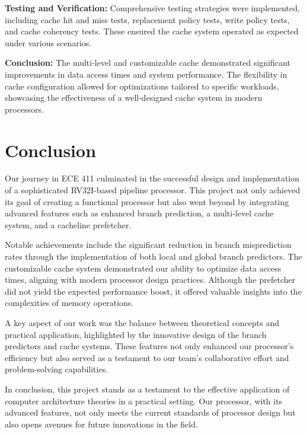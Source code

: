 \documentclass[12pt, a4paper]{article}
\begin{document}
    \textbf{Testing and Verification:}
    Comprehensive testing strategies were implemented, including cache hit and miss tests, replacement policy tests, write policy tests, and cache coherency tests. These ensured the cache system operated as expected under various scenarios.
    
    \textbf{Conclusion:}
    The multi-level and customizable cache demonstrated significant improvements in data access times and system performance. The flexibility in cache configuration allowed for optimizations tailored to specific workloads, showcasing the effectiveness of a well-designed cache system in modern processors.







    \section{Conclusion}

    Our journey in ECE 411 culminated in the successful design and implementation of a sophisticated RV32I-based pipeline processor. This project not only achieved its goal of creating a functional processor but also went beyond by integrating advanced features such as enhanced branch prediction, a multi-level cache system, and a cacheline prefetcher.

    Notable achievements include the significant reduction in branch misprediction rates through the implementation of both local and global branch predictors. The customizable cache system demonstrated our ability to optimize data access times, aligning with modern processor design practices. Although the prefetcher did not yield the expected performance boost, it offered valuable insights into the complexities of memory operations.
    
    A key aspect of our work was the balance between theoretical concepts and practical application, highlighted by the innovative design of the branch predictors and cache systems. These features not only enhanced our processor's efficiency but also served as a testament to our team's collaborative effort and problem-solving capabilities.
    
    In conclusion, this project stands as a testament to the effective application of computer architecture theories in a practical setting. Our processor, with its advanced features, not only meets the current standards of processor design but also opens avenues for future innovations in the field.
\end{document}
